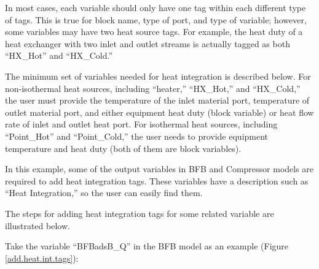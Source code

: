 In most cases, each variable should only have one tag within each different type of tags. This is true for block name, type of port, and type of variable; however, some variables may have two heat source tags. For example, the heat duty of a heat exchanger with two inlet and outlet streams is actually tagged as both ``HX\_Hot'' and ``HX\_Cold.''

The minimum set of variables needed for heat integration is described below. For non-isothermal heat sources, including ``heater,'' ``HX\_Hot,'' and ``HX\_Cold,'' the user must provide the temperature of the inlet material port, temperature of outlet material port, and either equipment heat duty (block variable) or heat flow rate of inlet and outlet heat port. For isothermal heat sources, including ``Point\_Hot'' and ``Point\_Cold,'' the user needs to provide equipment temperature and heat duty (both of them are block variables).

In this example, some of the output variables in BFB and Compressor models are required to add heat integration tags. These variables have a description such as ``Heat Integration,'' so the user can easily find them. 

The steps for adding heat integration tags for some related variable are illustrated below.

Take the variable ``BFBadsB\_Q'' in the BFB model as an example (Figure \ref{add.heat.int.tags}):

